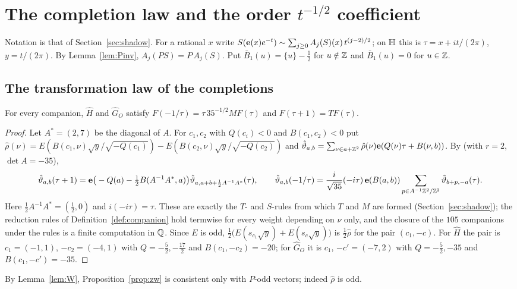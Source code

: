 \section{The completion law and the order $t^{-1/2}$ coefficient}\label{sec:radial}
Notation is that of Section~\ref{sec:shadow}. For a rational $x$ write $S(\mathbf{e}(x)e^{-t})\sim\sum_{j\ge0}A_j(S)(x)\,t^{(j-2)/2}$; on $\mathbb{H}$ this is $\tau=x+it/(2\pi)$, $y=t/(2\pi)$.
By Lemma~\ref{lem:Pinv}, $A_j(PS)=P\,A_j(S)$. Put $\bar B_1(u)=\{u\}-\frac12$ for $u\notin\mathbb{Z}$ and $\bar B_1(u)=0$ for $u\in\mathbb{Z}$.

\subsection{The transformation law of the completions}
\begin{proposition}\label{prop:zw}
For every companion, $\widehat H$ and $\widehat G_O$ satisfy $F(-1/\tau)=\tau\,35^{-1/2}MF(\tau)$ and $F(\tau+1)=TF(\tau)$.
\end{proposition}
\begin{proof}
Let $A^*=(2,7)$ be the diagonal of $A$. For $c_1,c_2$ with $Q(c_i)<0$ and $B(c_1,c_2)<0$ put $\hat\rho(\nu)=E(B(c_1,\nu)\sqrt y/\sqrt{-Q(c_1)})-E(B(c_2,\nu)\sqrt y/\sqrt{-Q(c_2)})$
and $\hat\vartheta_{a,b}=\sum_{\nu\in a+\mathbb{Z}^2}\hat\rho(\nu)\mathbf{e}(Q(\nu)\tau+B(\nu,b))$. By \cite[Cor.~2.9]{Zw} (with $r=2$, $\det A=-35$),
\[ \hat\vartheta_{a,b}(\tau+1)=\mathbf{e}\big(-Q(a)-\tfrac12B(A^{-1}A^*,a)\big)\hat\vartheta_{a,a+b+\frac12A^{-1}A^*}(\tau),\qquad
\hat\vartheta_{a,b}(-1/\tau)=\frac{i}{\sqrt{35}}(-i\tau)\,\mathbf{e}(B(a,b))\sum_{p\in A^{-1}\mathbb{Z}^2/\mathbb{Z}^2}\hat\vartheta_{b+p,-a}(\tau). \]
Here $\frac12A^{-1}A^*=(\frac12,0)$ and $i(-i\tau)=\tau$. These are exactly the $T$- and $S$-rules from which $T$ and $M$ are formed (Section~\ref{sec:shadow}); the
reduction rules of Definition~\ref{def:companion} hold termwise for every weight depending on $\nu$ only, and the closure of the $105$ companions under the rules is a
finite computation in $\mathbb{Q}$. Since $E$ is odd, $\frac12\big(E(s_{c_1}\sqrt y)+E(s_c\sqrt y)\big)$ is $\frac12\hat\rho$ for the pair $(c_1,-c)$. For $\widehat H$ the pair is
$c_1=(-1,1)$, $-c_2=(-4,1)$ with $Q=-\frac52,-\frac{17}2$ and $B(c_1,-c_2)=-20$; for $\widehat G_O$ it is $c_1$, $-c'=(-7,2)$ with $Q=-\frac52,-35$ and $B(c_1,-c')=-35$.
\end{proof}
By Lemma~\ref{lem:W}, Proposition~\ref{prop:zw} is consistent only with $P$-odd vectors; indeed $\hat\rho$ is odd.


